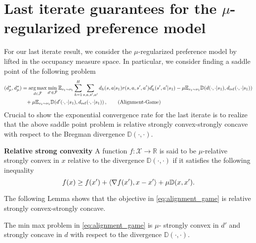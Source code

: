 \section{Last iterate guarantees for the $\mu$-regularized preference model}
For our last iterate result, we consider the $\mu$-regularized preference model by \cite{munos2024nash,shani2024multi} lifted in the occupancy measure space.
In particular, we consider finding a saddle point of the following problem
\begin{align}
    (d^\star_\mu, d^\star_\mu) &= \operatorname*{arg\,max}_{d\in\tilde{\mathcal{F}}} \min_{d'\in\tilde{\mathcal{F}}} \mathbb{E}_{s_1 \sim \nu_1}\sum^H_{h=1}\sum_{s,a,s',a'}  d_h(s,a | s_1)r(s,a,s',a') d_h'(s',a'|s_1) - \mu \mathbb{E}_{s_1 \sim \nu_1} \mathbb{D}(d(\cdot,\cdot|s_1),d_{\mathrm{ref}}(\cdot,\cdot|s_1)) \nonumber \\&\phantom{=}
    + \mu \mathbb{E}_{s_1 \sim \nu_1} \mathbb{D}(d'(\cdot,\cdot|s_1),d_{\mathrm{ref}}(\cdot,\cdot|s_1)) 
    \,, \label{eq:alignment_game} \tag{Alignment-Game}
\end{align}
Crucial to show the exponential convergence rate for the last iterate is to realize that the above saddle point problem is relative strongly convex-strongly concave with respect to the Bregman divergence $\mathbb{D}(\cdot,\cdot)$.
\begin{definition}
\textbf{Relative strong convexity}
A function $f:\mathcal{X}\rightarrow\mathbb{R}$ is said to be $\mu$-relative strongly convex  in $x$ relative to the divergence $\mathbb{D}(\cdot,\cdot)$ if it satisfies the following inequality
\begin{equation*}
    f(x) \geq f(x') + \left\langle{\nabla f(x')},{x - x'}\right\rangle + \mu \mathbb{D}(x,x').
\end{equation*}
\end{definition}
The following Lemma shows that the objective in \ref{eq:alignment_game} is relative strongly convex-strongly concave.
\begin{lemma}
The min max problem in \ref{eq:alignment_game} is $\mu$- strongly convex in $d'$ and strongly concave in $d$ with respect to the divergence $\mathbb{D}(\cdot,\cdot)$.
\end{lemma}
